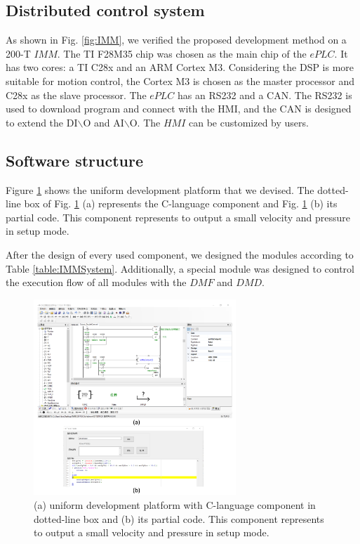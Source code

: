 \documentclass[journal,UTF8]{IEEEtran}
\begin{document}
	\subsection{Distributed control system}
	As shown in Fig. \ref{fig:IMM}, we verified the proposed development method on a 200-T $IMM$. The TI F28M35 chip was chosen as the main chip of the $ePLC$. It has two cores: a TI C28x and an ARM Cortex M3. Considering the DSP is more suitable for motion control, the Cortex M3 is chosen as the master processor and C28x as the slave processor. The $ePLC$ has an RS232 and a CAN. The RS232 is used to download program and connect with the HMI, and the CAN is designed to extend the DI$\backslash$O and AI$\backslash$O. The $HMI$ can be customized by users.
	
	\subsection{Software structure}
	Figure \ref{fig:ld} shows the uniform development platform that we devised. The dotted-line box of Fig. \ref{fig:ld} (a) represents the C-language component and Fig. \ref{fig:ld} (b) its partial code. This component represents to output a small velocity and pressure in setup mode.
	
	After the design of every used component, we designed the modules according to Table \ref{table:IMMSystem}. Additionally, a special module was designed to control the execution flow of all modules with the $DMF$ and $DMD$.
	
	\begin{figure}
		\centering
		\includegraphics[width=3in]{fig/ld.pdf}
		\caption{(a) uniform development platform with C-language component in dotted-line box and (b) its partial code. This component represents to output a small velocity and pressure in setup mode.}
		\label{fig:ld}
	\end{figure}
	
\end{document}
